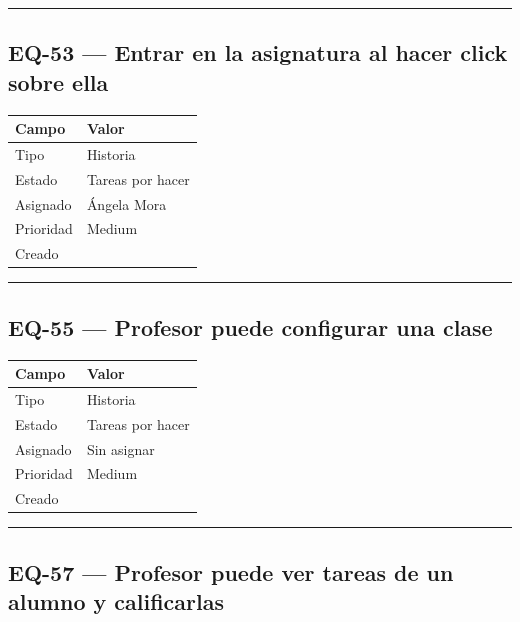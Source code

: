 \documentclass[
  spanish,
  11pt,
]{report}
\newcounter{none} %
\begin{document}
\begin{center}\rule{0.5\linewidth}{0.5pt}\end{center}

\subsection{EQ-53 --- Entrar en la asignatura al hacer click sobre
ella}\label{eq-53-entrar-en-la-asignatura-al-hacer-click-sobre-ella}

{\def\LTcaptype{none} %
\begin{longtable}[]{@{}ll@{}}
\toprule\noalign{}
Campo & Valor \\
\midrule\noalign{}
\endhead
\bottomrule\noalign{}
\endlastfoot
Tipo & Historia \\
Estado & Tareas por hacer \\
Asignado & Ángela Mora \\
Prioridad & Medium \\
Creado & \\
\end{longtable}
}

\begin{center}\rule{0.5\linewidth}{0.5pt}\end{center}

\subsection{EQ-55 --- Profesor puede configurar una
clase}\label{eq-55-profesor-puede-configurar-una-clase}

{\def\LTcaptype{none} %
\begin{longtable}[]{@{}ll@{}}
\toprule\noalign{}
Campo & Valor \\
\midrule\noalign{}
\endhead
\bottomrule\noalign{}
\endlastfoot
Tipo & Historia \\
Estado & Tareas por hacer \\
Asignado & Sin asignar \\
Prioridad & Medium \\
Creado & \\
\end{longtable}
}

\begin{center}\rule{0.5\linewidth}{0.5pt}\end{center}

\subsection{EQ-57 --- Profesor puede ver tareas de un alumno y
calificarlas}\label{eq-57-profesor-puede-ver-tareas-de-un-alumno-y-calificarlas}
\end{document}
